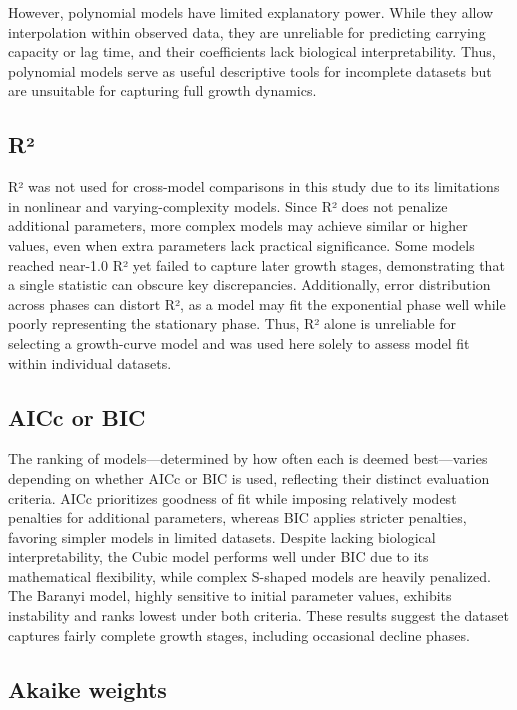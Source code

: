 \documentclass{article}
\begin{document}
However, polynomial models have limited explanatory power. While they allow interpolation within observed data, they are unreliable for predicting carrying capacity or lag time, and their coefficients lack biological interpretability. Thus, polynomial models serve as useful descriptive tools for incomplete datasets but are unsuitable for capturing full growth dynamics.

\subsection{R²}

R² was not used for cross-model comparisons in this study due to its limitations in nonlinear and varying-complexity models. Since R² does not penalize additional parameters, more complex models may achieve similar or higher values, even when extra parameters lack practical significance. Some models reached near-1.0 R² yet failed to capture later growth stages, demonstrating that a single statistic can obscure key discrepancies. Additionally, error distribution across phases can distort R², as a model may fit the exponential phase well while poorly representing the stationary phase. Thus, R² alone is unreliable for selecting a growth-curve model and was used here solely to assess model fit within individual datasets.


\subsection{AICc or BIC}

The ranking of models—determined by how often each is deemed best—varies depending on whether AICc or BIC is used, reflecting their distinct evaluation criteria. AICc prioritizes goodness of fit while imposing relatively modest penalties for additional parameters, whereas BIC applies stricter penalties, favoring simpler models in limited datasets. Despite lacking biological interpretability, the Cubic model performs well under BIC due to its mathematical flexibility, while complex S-shaped models are heavily penalized. The Baranyi model, highly sensitive to initial parameter values, exhibits instability and ranks lowest under both criteria. These results suggest the dataset captures fairly complete growth stages, including occasional decline phases.




\subsection{Akaike weights}
\end{document}
